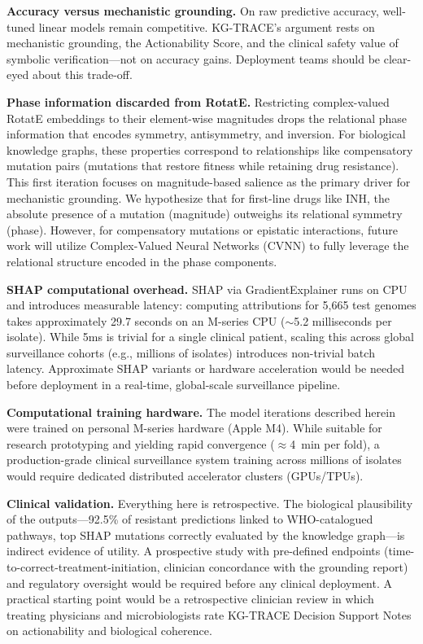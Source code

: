 \documentclass[conference]{IEEEtran}
\begin{document}
\noindent\textbf{Accuracy versus mechanistic grounding.}
On raw predictive accuracy, well-tuned linear models remain competitive. KG-TRACE's argument rests on mechanistic grounding, the Actionability Score, and the clinical safety value of symbolic verification---not on accuracy gains. Deployment teams should be clear-eyed about this trade-off.

\noindent\textbf{Phase information discarded from RotatE.}
Restricting complex-valued RotatE embeddings to their element-wise magnitudes drops the relational phase information that encodes symmetry, antisymmetry, and inversion. For biological knowledge graphs, these properties correspond to relationships like compensatory mutation pairs (mutations that restore fitness while retaining drug resistance). This first iteration focuses on magnitude-based salience as the primary driver for mechanistic grounding. We hypothesize that for first-line drugs like INH, the absolute presence of a mutation (magnitude) outweighs its relational symmetry (phase). However, for compensatory mutations or epistatic interactions, future work will utilize Complex-Valued Neural Networks (CVNN) to fully leverage the relational structure encoded in the phase components.

\noindent\textbf{SHAP computational overhead.}
SHAP via GradientExplainer runs on CPU and introduces measurable latency: computing attributions for 5,665 test genomes takes approximately 29.7 seconds on an M-series CPU ($\sim$5.2 milliseconds per isolate). While 5ms is trivial for a single clinical patient, scaling this across global surveillance cohorts (e.g., millions of isolates) introduces non-trivial batch latency. Approximate SHAP variants or hardware acceleration would be needed before deployment in a real-time, global-scale surveillance pipeline.

\noindent\textbf{Computational training hardware.}
The model iterations described herein were trained on personal M-series hardware (Apple M4). While suitable for research prototyping and yielding rapid convergence ($\approx$4~min per fold), a production-grade clinical surveillance system training across millions of isolates would require dedicated distributed accelerator clusters (GPUs/TPUs).

\noindent\textbf{Clinical validation.}
Everything here is retrospective. The biological plausibility of the outputs---92.5\% of resistant predictions linked to WHO-catalogued pathways, top SHAP mutations correctly evaluated by the knowledge graph---is indirect evidence of utility. A prospective study with pre-defined endpoints (time-to-correct-treatment-initiation, clinician concordance with the grounding report) and regulatory oversight would be required before any clinical deployment. A practical starting point would be a retrospective clinician review in which treating physicians and microbiologists rate KG-TRACE Decision Support Notes on actionability and biological coherence.
\end{document}
